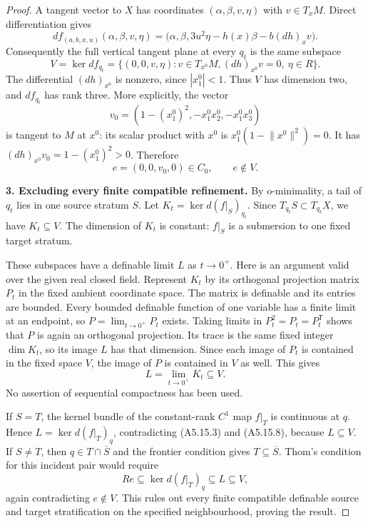 \begin{proof}
A tangent vector to $X$ has coordinates $(\alpha,\beta,v,\eta)$
with $v\in T_xM$. Direct differentiation gives
\[
 df_{(a,b,x,u)}(\alpha,\beta,v,\eta)
   =\bigl(\alpha,\beta,
           3u^2\eta-h(x)\beta-b(dh)_xv\bigr).
 \tag{A5.15.5}
\]
Consequently the full vertical tangent plane at every $q_t$ is
the same subspace
\[
 V=\ker df_{q_t}
   =\{(0,0,v,\eta):v\in T_{x^0}M,
                         (dh)_{x^0}v=0,\ \eta\in R\}.
 \tag{A5.15.6}
\]
The differential $(dh)_{x^0}$ is nonzero, since $|x^0_1|<1$.
Thus $V$ has dimension two, and $df_{q_t}$ has rank three.
More explicitly, the vector
\[
 v_0=(1-(x^0_1)^2,-x^0_1x^0_2,-x^0_1x^0_3)
 \tag{A5.15.7}
\]
is tangent to $M$ at $x^0$: its scalar product with $x^0$ is
$x^0_1(1-\lVert x^0\rVert^2)=0$. It has
$(dh)_{x^0}v_0=1-(x^0_1)^2>0$. Therefore
\[
 e=(0,0,v_0,0)\in C_0,\qquad e\notin V.
 \tag{A5.15.8}
\]

\medskip\noindent\textbf{3. Excluding every finite compatible refinement.}
By o-minimality, a tail of $q_t$ lies in one source stratum $S$.
Let $K_t=\ker d(f|_S)_{q_t}$. Since $T_{q_t}S\subset T_{q_t}X$,
we have $K_t\subseteq V$. The dimension of $K_t$ is constant:
$f|_S$ is a submersion to one fixed target stratum.

These subspaces have a definable limit $L$ as $t\to0^+$. Here is
an argument valid over the given real closed field. Represent $K_t$
by its orthogonal projection matrix $P_t$ in the fixed ambient
coordinate space. The matrix is definable and its entries are bounded.
Every bounded definable function of one variable has a finite limit
at an endpoint, so $P=\lim_{t\to0^+}P_t$ exists. Taking limits in
$P_t^2=P_t=P_t^{\mathsf T}$ shows that $P$ is again an orthogonal
projection. Its trace is the same fixed integer $\dim K_t$, so its
image $L$ has that dimension. Since each image of $P_t$ is contained
in the fixed space $V$, the image of $P$ is contained in $V$ as well.
This gives
\[
 L=\lim_{t\to0^+}K_t\subseteq V.
 \tag{A5.15.9}
\]
No assertion of sequential compactness has been used.

If $S=T$, the kernel bundle of the constant-rank $C^1$ map
$f|_T$ is continuous at $q$. Hence $L=\ker d(f|_T)_q$,
contradicting (A5.15.3) and (A5.15.8), because $L\subseteq V$.
If $S\ne T$, then $q\in T\cap\overline S$ and the frontier
condition gives $T\subseteq\overline S$. Thom's condition for this
incident pair would require
\[
 Re\subseteq\ker d(f|_T)_q\subseteq L\subseteq V,
\]
again contradicting $e\notin V$. This rules out every finite
compatible definable source and target stratification on the
specified neighbourhood, proving the result.
\end{proof}

